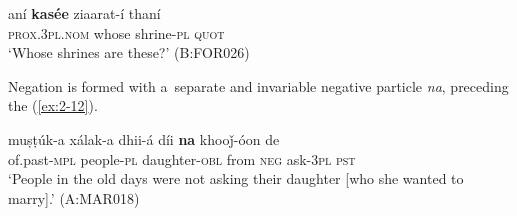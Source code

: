 \begin{exe}
\ex
\label{ex:2-11}
\gll aní \textbf{kasée} ziaarat-í thaní \\
	\textsc{prox.3pl.nom} whose shrine-\textsc{pl} \textsc{quot} \\
\glt `Whose shrines are these?' (B:FOR026)
\end{exe}

Negation is formed with a~separate and invariable negative particle \textit{na}, preceding the  (\ref{ex:2-12}).

\begin{exe}
\ex
\label{ex:2-12}
\gll muṣṭúk-a xálak-a dhii-á díi \textbf{na} khooǰ-óon de \\
	of.past-\textsc{mpl} people-\textsc{pl} daughter-\textsc{obl} from \textsc{neg} ask-\textsc{3pl} \textsc{pst} \\
\glt `People in the old days were not asking their daughter [who she wanted to marry].' (A:MAR018)
\end{exe}